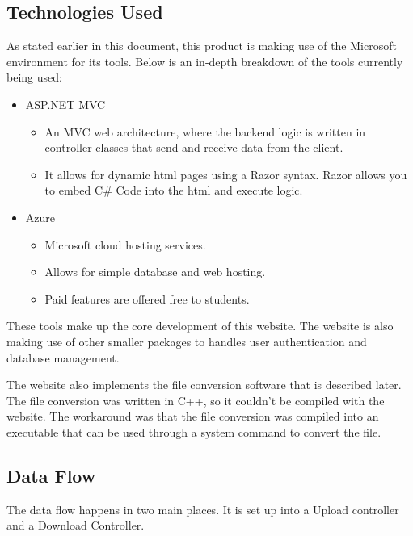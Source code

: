 \subsection{Technologies Used}

    As stated earlier in this document, this product is making use
    of the Microsoft environment for its tools. Below is an in-depth 
    breakdown of the tools currently being used:

    \begin{itemize}
    \item ASP.NET MVC
    \begin{itemize}
        \item An MVC web architecture, where the backend logic is written in controller classes
        that send and receive data from the client.
        \item It allows for dynamic html pages using a Razor syntax. Razor allows
        you to embed C\# Code into the html and execute logic.
    \end{itemize}
    
    \item Azure
        \begin{itemize}
            \item Microsoft cloud hosting services.
            \item Allows for simple database and web hosting.
            \item Paid features are offered free to students.
        \end{itemize}
    \end{itemize}

    These tools make up the core development of this website. The website is also
    making use of other smaller packages to handles user authentication and database management.

    The website also implements the file conversion software that is described later.
    The file conversion was written in C++, so it couldn't be compiled with the website.
    The workaround was that the file conversion was compiled into an executable that can be used through a system command to convert the file.


    \subsection{Data Flow}
    The data flow happens in two main places. It is set up into a Upload controller
    and a Download Controller.

